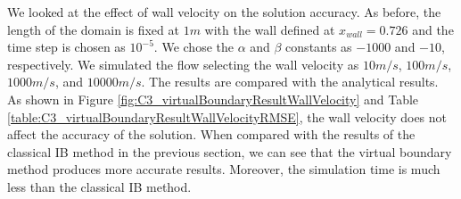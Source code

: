 We looked at the effect of wall velocity on the solution accuracy. As before, the length of the domain is fixed at $1 m$ with the wall defined at $x_{wall} = 0.726$ and the time step is chosen as $10^{-5}$. We chose the $\alpha$ and $\beta$ constants as $-1000$ and $-10$, respectively. We simulated the flow selecting the wall velocity as $10 m/s$, $100 m/s$, $1000 m/s$, and $10000 m/s$. The results are compared with the analytical results. As shown in Figure \ref{fig:C3_virtualBoundaryResultWallVelocity} and Table \ref{table:C3_virtualBoundaryResultWallVelocityRMSE}, the wall velocity does not affect the accuracy of the solution. When compared with the results of the classical IB method in the previous section, we can see that the virtual boundary method produces more accurate results. Moreover, the simulation time is much less than the classical IB method.

